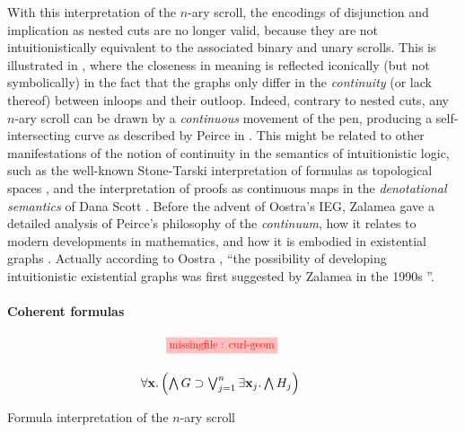 With this interpretation of the $n$-ary scroll, the  encodings of
disjunction and implication as nested cuts are no longer valid, because they are
not intuitionistically equivalent to the associated binary and unary scrolls.
This is illustrated in , where the closeness in meaning is
reflected iconically (but not symbolically) in the fact that the graphs only
differ in the \emph{continuity} (or lack thereof) between inloops and their
outloop. Indeed, contrary to nested cuts, any $n$-ary scroll can be drawn by a
\emph{continuous} movement of the pen, producing a self-intersecting curve as
described by Peirce in \cite{peirce_prolegomena_1906}. This might be related to
other manifestations of the notion of continuity in the semantics of
intuitionistic logic, such as the well-known Stone-Tarski interpretation of
formulas as topological spaces \cite{stone_topological_1938}, and the
interpretation of proofs as continuous maps in the \emph{denotational semantics}
of Dana Scott . Before the advent of Oostra's
IEG, Zalamea gave a detailed analysis of Peirce's philosophy of
the \emph{continuum}, how it relates to modern developments in mathematics, and
how it is embodied in existential graphs \cite{zalamea_peirces_2003}. Actually
according to Oostra , ``the
possibility of developing intuitionistic existential graphs was first suggested
by Zalamea in the 1990s \cite{zalamea_ieg_1}\cite{zalamea_ieg_2}''.

\paragraph{Coherent formulas}

\begin{marginfigure}
  $$
  \!\!\!\!
  \!\!\!\!
  \!\!\!\!
  \begin{array}{c}
    \tikzfig{0.85}{0.85}{curl-geom} \vspace{1.5em}\\
    \forall \bx. \left(\bigwedge G \limp \bigvee_{j = 1}^{n}\exists \bx_j. \bigwedge H_j\right)
  \end{array}
  $$
  \caption{Formula interpretation of the $n$-ary scroll}
\end{marginfigure}

